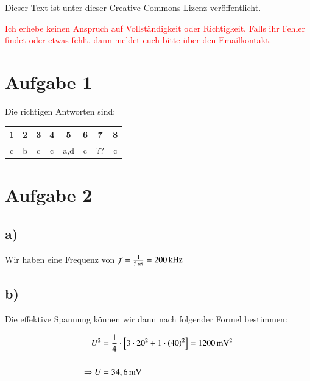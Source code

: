 




\maketitle

Dieser Text ist unter dieser \href{http://creativecommons.org/licenses/by-nc-sa/4.0/}{Creative Commons} Lizenz veröffentlicht.

\textcolor{red}{Ich erhebe keinen Anspruch auf Vollständigkeit oder Richtigkeit. Falls ihr Fehler findet oder etwas fehlt, dann meldet euch bitte über den Emailkontakt.}

\tableofcontents


\newpage



\section{Aufgabe 1}

Die richtigen Antworten sind:


\begin{center}
	\begin{tabular}{c|c|c|c|c|c|c|c}
		1 & 2 & 3 & 4 & 5 & 6 & 7 & 8 \\ 
		\hline c & b & c & c & a,d & c & ?? & c \\  
	\end{tabular} 
\end{center}


\section{Aufgabe 2}

\subsection*{a)}

Wir haben eine Frequenz von $f = \frac{1}{\unit[5]{\mu s}} = \unit[200]{kHz}$

\subsection*{b)}

Die effektive Spannung können wir dann nach folgender Formel bestimmen:

\begin{align*}
	U^2 &= \frac{1}{4} \cdot \left[ 3 \cdot 20^2 + 1 \cdot \left( 40 \right)^2 \right] = \unit[1200]{m V^2} \\
	\hfill \\
	\Rightarrow U &= \unit[34,6]{mV}
\end{align*}


